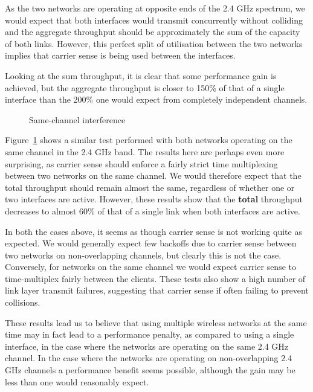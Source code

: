 As the two networks are operating at opposite ends of the 2.4 GHz spectrum, we would expect that both interfaces would transmit concurrently without colliding and the aggregate throughput should be approximately the sum of the capacity of both links. However, this perfect split of utilisation between the two networks implies that carrier sense is being used between the interfaces.

Looking at the sum throughput, it is clear that some performance gain is
achieved, but the aggregate throughput is closer to 150\% of that of a
single interface than the 200\% one would expect from completely independent
channels.

\begin{figure}[h]
 \centering
 
 \caption{Same-channel interference}\label{graph:sc-interference}
\end{figure}

Figure~\ref{graph:sc-interference} shows a similar test performed with both networks operating on the same channel in the 2.4 GHz band. The results here are
perhaps even more surprising, as carrier sense should enforce a fairly strict
time multiplexing between two networks on the same channel. We would therefore expect that the total
throughput should remain almost the same, regardless of whether one or two interfaces are
active. However, these results show that the
\textbf{total} throughput decreases to almost 60\% of that of a single link when
both interfaces are active.

In both the cases above, it seems as though carrier sense is not working quite as expected. We would generally expect few backoffs due to carrier sense between two networks on non-overlapping channels, but clearly this
is not the case. Conversely, for networks on the same channel we would expect carrier sense to time-multiplex fairly between the clients. These tests also show a high number of link layer transmit failures, suggesting that
carrier sense if often failing to prevent collisions.

These results lead us to believe that using multiple wireless networks at the
same time may in fact lead to a performance penalty, as compared to using a
single interface, in the case where the networks are operating on the same 2.4 GHz channel. In the case where the networks are operating on non-overlapping 2.4 GHz channels a performance benefit seems possible, although the gain may be less than one would reasonably expect.

